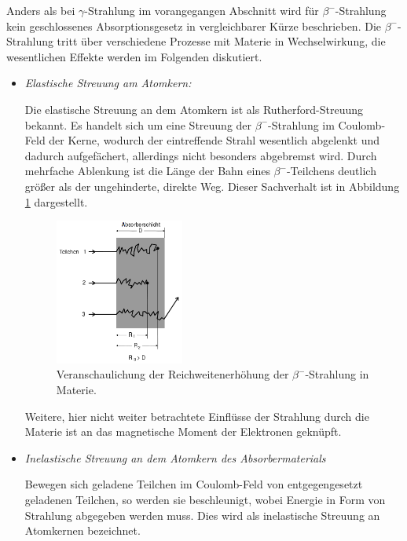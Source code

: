 Anders als bei $\gamma$-Strahlung im vorangegangen Abschnitt wird für  $\beta^-$-Strahlung kein geschlossenes Absorptionsgesetz in vergleichbarer Kürze beschrieben.
Die $\beta^-$-Strahlung tritt über verschiedene Prozesse mit Materie in Wechselwirkung, die wesentlichen Effekte werden im Folgenden diskutiert.

\begin{itemize}
	\item{\emph{Elastische Streuung am Atomkern:}}

Die elastische Streuung an dem Atomkern ist als Rutherford-Streuung bekannt.
Es handelt sich um eine Streuung der $\beta^-$-Strahlung im Coulomb-Feld der Kerne, wodurch der eintreffende Strahl wesentlich abgelenkt und dadurch aufgefächert, allerdings nicht besonders abgebremst wird.
Durch mehrfache Ablenkung ist die Länge der Bahn eines $\beta^-$-Teilchens deutlich größer als der ungehinderte, direkte Weg.
Dieser Sachverhalt ist in Abbildung \ref{fig:bahnen} dargestellt.\\
\begin{figure}[hb]
	\centering
	\includegraphics[width=0.4\textwidth]{Bilder/reichweite.png}
	\caption{Veranschaulichung der Reichweitenerhöhung der $\beta^-$-Strahlung in Materie. \cite{skript}}
	\label{fig:bahnen}
\end{figure}
Weitere, hier nicht weiter betrachtete Einflüsse der Strahlung durch die Materie ist an das magnetische Moment der Elektronen geknüpft.

\item{\emph{Inelastische Streuung an dem Atomkern des Absorbermaterials}}

Bewegen sich geladene Teilchen im Coulomb-Feld von entgegengesetzt geladenen Teilchen, so werden sie beschleunigt, 
wobei Energie in Form von Strahlung abgegeben werden muss.
Dies wird als inelastische Streuung an Atomkernen bezeichnet.


\end{itemize}
